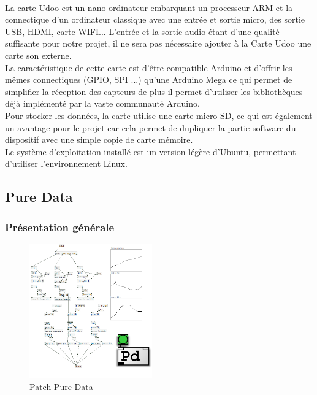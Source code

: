 \documentclass[a4paper, titlepage, oneside, 12pt]{article}%
\begin{document}
\paragraph{}
La carte Udoo est un nano-ordinateur embarquant un processeur ARM et la connectique d'un ordinateur classique avec une entrée et sortie micro, des sortie USB, HDMI, carte WIFI... L'entrée et la sortie audio étant d'une qualité suffisante pour notre projet, il ne sera pas nécessaire ajouter à la Carte Udoo une carte son externe.\\
La caractéristique de cette carte est d’être compatible Arduino et d'offrir les mêmes connectiques (GPIO, SPI ...) qu'une Arduino Mega ce qui permet de simplifier la réception des capteurs de plus il permet d'utiliser les bibliothèques déjà implémenté par la vaste communauté Arduino.\\
Pour stocker les données, la carte utilise une carte micro SD, ce qui est également un avantage pour le projet car cela permet de dupliquer la partie software du dispositif avec une simple copie de carte mémoire.\\
Le système d'exploitation installé est un version légère d'Ubuntu, permettant d'utiliser l’environnement Linux.

\subsection{Pure Data}
\subsubsection{Présentation générale}
\begin{figure}
  \centering
  \includegraphics[width=200px]{pd.jpg}
  \caption{Patch Pure Data}
\end{figure}
\end{document}
